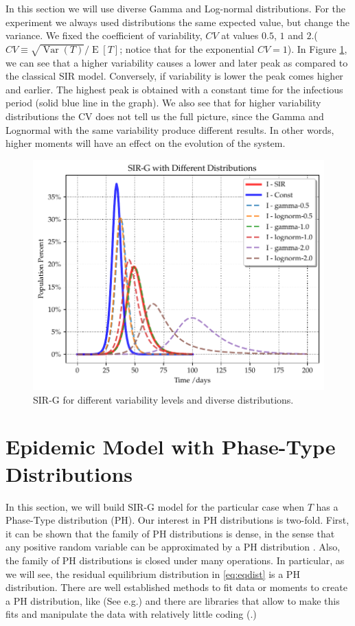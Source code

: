 \documentclass[USenglish,10pt]{article}
\newcommand{\eg}{e.g.\xspace}
\DeclareMathOperator{\Exp}{E}       %
\newcommand{\E}[1]{\Exp\left[{#1}\right]}       %
\DeclareMathOperator{\Var}{Var}   %
\begin{document}
In this section we will use diverse Gamma and Log-normal distributions. For the experiment we always used distributions the same expected value, but change the variance.
We fixed the coefficient of variability, $CV$ at values $0.5$, $1$ and $2$.( $CV \equiv \sqrt{\Var{(T)}}/\E{T}$; notice that for the exponential $CV=1$).
In Figure \ref{fig:var}, we can see that a higher variability causes a lower and later peak as compared to the classical SIR model.
Conversely, if variability is lower the peak comes higher and earlier. The highest peak is obtained with a constant time for the infectious period (solid blue line in the graph).
We also see that for higher variability distributions the CV does not tell us the full picture, since the Gamma and Lognormal with the same variability produce different results. In other words, higher moments will have an effect on the evolution of the system.

\begin{figure}
	\centering
	\includegraphics[width=.8\linewidth]{Variance-Analysis.pdf}
	\caption{SIR-G for different variability levels and diverse distributions.}
	\label{fig:var}
\end{figure}

\section{Epidemic Model with Phase-Type Distributions}\label{sc:PH}

In this section, we will build SIR-G model for the particular case when $T$ has a Phase-Type distribution (PH)\cite{neut81,lato.rama99}. Our interest in PH distributions is two-fold. First, it can be shown that the family of PH distributions is dense, in the sense that any positive random variable can be approximated by a PH distribution \cite{neut81}.
Also, the family of PH distributions is closed under many operations. In particular, as we will see, the residual equilibrium distribution in \eqref{eq:eqdist} is a PH distribution.
There are well established methods to fit data or moments to create a PH distribution, like (See \eg \cite{bobb.horv.ea03,bobb.horv.ea05,thum.buch.ea05}) and there are libraries that allow to make this fits and manipulate the data with relatively little coding (\cite{Per.ea.17,tele.torv20}.)
\end{document}

